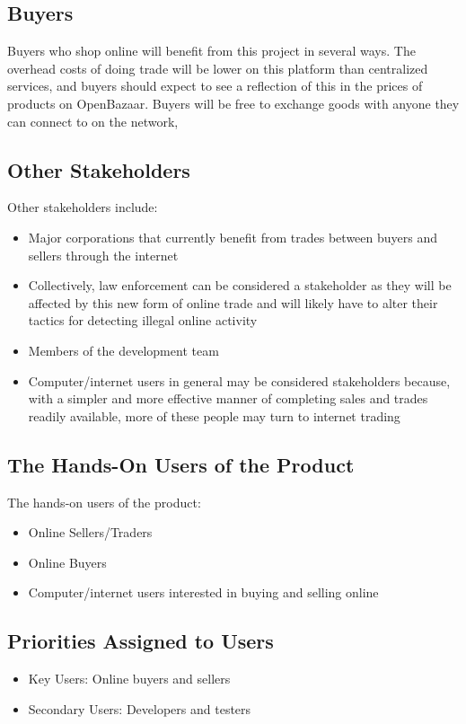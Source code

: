\documentclass{article}
\begin{document}
\subsection{Buyers}
Buyers who shop online will benefit from this project in several ways. The overhead costs of doing trade will be lower on this platform than centralized services, and buyers should expect to see a reflection of this in the prices of products on OpenBazaar. Buyers will be free to exchange goods with anyone they can connect to on the network, 
\subsection{Other Stakeholders}
Other stakeholders include:
\begin{itemize}
\item
Major corporations that currently benefit from trades between buyers and sellers through the internet
\item
Collectively, law enforcement can be considered a stakeholder as they will be affected by this new form of online trade and will likely have to alter their tactics for detecting illegal online activity
\item
Members of the development team
\item
Computer/internet users in general may be considered stakeholders because, with a simpler and more effective manner of completing sales and trades readily available, more of these people may turn to internet trading
\end{itemize}
\subsection{The Hands-On Users of the Product}
The hands-on users of the product:
\begin{itemize}
\item
Online Sellers/Traders
\item
Online Buyers
\item
Computer/internet users interested in buying and selling online
\end{itemize}
\subsection{Priorities Assigned to Users}
\begin{itemize}
\item
Key Users: Online buyers and sellers
\item
Secondary Users: Developers and testers
\end{itemize}
\end{document}
